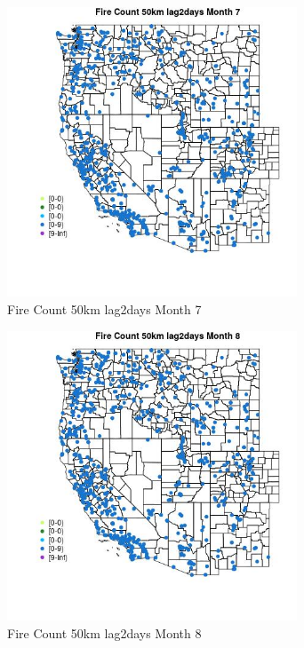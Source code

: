 \begin{figure} 
\centering  
\includegraphics[width=0.77\textwidth]{Code_Outputs/Report_ML_input_PM25_Step4_part_e_de_duplicated_aves_compiled_2019-05-21wNAs_MapObsMo7Fire_Count_50km_lag2days.jpg} 
\caption{\label{fig:Report_ML_input_PM25_Step4_part_e_de_duplicated_aves_compiled_2019-05-21wNAsMapObsMo7Fire_Count_50km_lag2days}Fire Count 50km lag2days Month 7} 
\end{figure} 
 

\begin{figure} 
\centering  
\includegraphics[width=0.77\textwidth]{Code_Outputs/Report_ML_input_PM25_Step4_part_e_de_duplicated_aves_compiled_2019-05-21wNAs_MapObsMo8Fire_Count_50km_lag2days.jpg} 
\caption{\label{fig:Report_ML_input_PM25_Step4_part_e_de_duplicated_aves_compiled_2019-05-21wNAsMapObsMo8Fire_Count_50km_lag2days}Fire Count 50km lag2days Month 8} 
\end{figure} 
 

